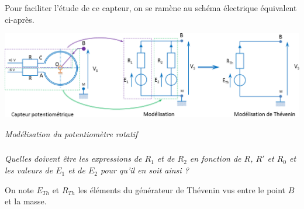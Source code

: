 \documentclass[10pt]{article}
\newif\ifprof
\begin{document}
\ifprof
\begin{corrige}
Lorsque $\alpha = -\pi$, $R' = 0$; lorsque $\alpha = \pi$, $R' = R_0 $. La variation de résistance est proportionnelle au secteur angulaire, on a donc : 
$$ R' (\alpha)= \dfrac{R_0}{2} + \dfrac{R_0}{2\pi} \alpha  $$
\end{corrige}
\else
\fi

\ifprof
\else
Pour faciliter l'étude de ce capteur, on se ramène au schéma électrique équivalent ci-après.

\begin{center}
\includegraphics[width=\textwidth]{images/modele}

\textit{Modélisation du potentiomètre rotatif}
\end{center}
\fi

\subparagraph{}
\textit{Quelles doivent être les expressions de $R_1$ et de $R_2$ en fonction de $R$, $R'$ et $R_0$ et les valeurs de $E_1$ et de $E_2$ pour qu'il en soit ainsi ?}
\ifprof
\begin{corrige}

Pour que la modélisation soit conforme au capteur initial, il faut nécessairement que : 
\begin{itemize}
\item $R_1 = R + R_0 - R'$;
\item $R_2 = R + R'$;
\item $E_1 = +6 V$; 
\item $E_2 = -6 V$.
\end{itemize}
\end{corrige}
\else
\fi

On note $E_{Th}$ et $R_{Th}$ les éléments du générateur de Thévenin vus entre le point $B$ et la masse. 
\end{document}
